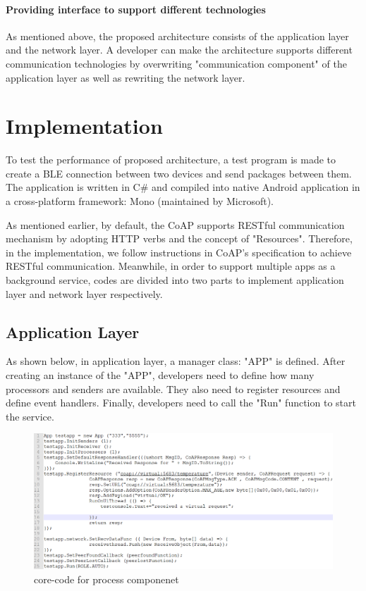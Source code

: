 \documentclass{Nan_Thesis}
\begin{document}
\subsubsection{Providing interface to support different technologies}
As mentioned above, the proposed architecture consists of the application layer and the network layer. A developer can make the architecture supports different communication technologies by overwriting "communication component" of the application layer as well as rewriting the network layer. 
\chapter{Implementation}
To test the performance of proposed architecture, a test program is made to create a BLE connection between two devices and send packages between them. The application is written in C\# and compiled into native Android application in a cross-platform framework: Mono (maintained by Microsoft). 

As mentioned earlier, by default, the CoAP supports RESTful communication mechanism by adopting HTTP verbs and the concept of "Resources". Therefore, in the implementation, we follow instructions in CoAP’s specification to achieve RESTful communication. Meanwhile, in order to support multiple apps as a background service, codes are divided into two parts to implement application layer and network layer respectively. 

\section{Application Layer}
As shown below, in application layer, a manager class: "APP" is defined. After creating an instance of the "APP", developers need to define how many processors and senders are available. They also need to register resources and define event handlers. Finally, developers need to call the "Run" function to start the service.  

\begin{figure}[H]
  \centering 
      \includegraphics[scale=0.5]{pic/code1.png} 
  \caption{core-code for process componenet}
\end{figure}
\end{document}
